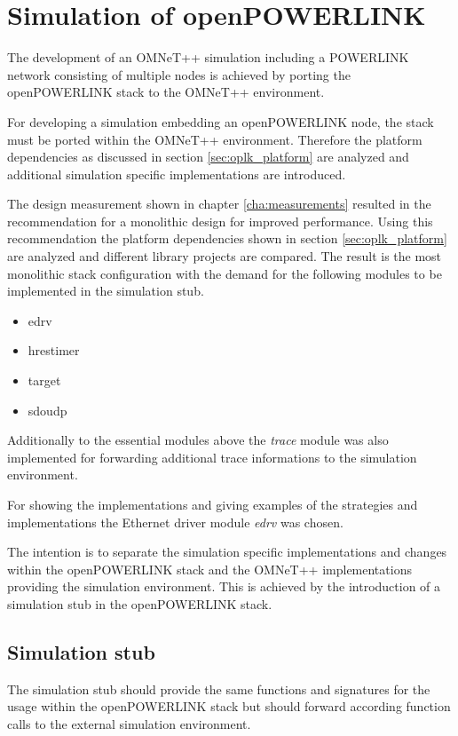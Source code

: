 \chapter{Simulation of openPOWERLINK}
\label{cha:porting}
The development of an OMNeT++ simulation including a POWERLINK network consisting of multiple nodes is achieved by porting the openPOWERLINK stack to the OMNeT++ environment.

For developing a simulation embedding an openPOWERLINK node, the stack must be ported within the OMNeT++ environment.
Therefore the platform dependencies as discussed in section \ref{sec:oplk_platform} are analyzed and additional simulation specific implementations are introduced.

The design measurement shown in chapter \ref{cha:measurements} resulted in the recommendation for a monolithic design for improved performance.
Using this recommendation the platform dependencies shown in section \ref{sec:oplk_platform} are analyzed and different library projects are compared.
The result is the most monolithic stack configuration with the demand for the following modules to be implemented in the simulation stub.

\begin{itemize}
    \item edrv
    \item hrestimer
    \item target
    \item sdoudp
\end{itemize}

Additionally to the essential modules above the \emph{trace} module was also implemented for forwarding additional trace informations to the simulation environment.

For showing the implementations and giving examples of the strategies and implementations the Ethernet driver module \emph{edrv} was chosen.

The intention is to separate the simulation specific implementations and changes within the openPOWERLINK stack and the OMNeT++ implementations providing the simulation environment.
This is achieved by the introduction of a simulation stub in the openPOWERLINK stack.

\section{Simulation stub}
\label{sec:porting_simstub}

The simulation stub should provide the same functions and signatures for the usage within the openPOWERLINK stack but should forward according function calls to the external simulation environment.

